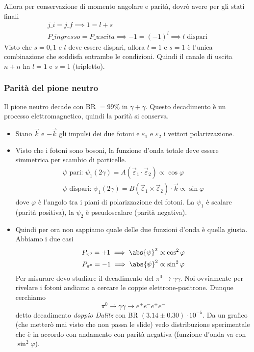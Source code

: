 Allora per conservazione di momento angolare e parità, dovrò avere per gli stati finali 
\begin{gather*}
j\_i=j\_f\implies 1=l+s\\
P\_{ingresso}=P\_{uscita}\implies -1=(-1)^l\implies l \text{ dispari}
\end{gather*}
Visto che $s=0,1$ e $l$ deve essere dispari, allora $l=1$ e $s=1$ è l'unica combinazione che soddisfa entrambe le condizioni. Quindi il canale di uscita $n+n$ ha $l=1$ e $s=1$ (tripletto).
\subsubsection{Parità del pione neutro}
Il pione neutro decade con BR $=99\%$ in $\gamma+\gamma$. Questo decadimento è un processo elettromagnetico, quindi la parità si conserva. 
\begin{itemize}
\item Siano $\vec k$ e $-\vec k$ gli impulsi dei due fotoni e $\varepsilon_1$ e $\varepsilon_2$ i vettori polarizzazione.
\item Visto che i fotoni sono bosoni, la funzione d'onda totale deve essere simmetrica per scambio di particelle.
\begin{gather*}
\psi\text{ pari: } \psi_1(2\gamma)=A(\vec\varepsilon_1\cdot\vec\varepsilon_2)\propto\cos\varphi\\
\psi\text{ dispari: } \psi_1(2\gamma)=B(\vec\varepsilon_1\times\vec\varepsilon_2)\cdot \vec k\propto\sin\varphi
\end{gather*}
dove $\varphi$ è l'angolo tra i piani di polarizzazione dei fotoni. La $\psi_1$ è scalare (parità positiva), la $\psi_2$ è pseudoscalare (parità negativa). 
\item Quindi per ora non sappiamo quale delle due funzioni d'onda è quella giusta. Abbiamo i due casi 
\begin{gather*}
P_{\pi^0}=+1\implies \abs{\psi}^2\propto\cos^2\varphi\\
P_{\pi^0}=-1\implies \abs{\psi}^2\propto\sin^2\varphi
\end{gather*}
Per misurare devo studiare il decadimento del $\pi^0\to\gamma\gamma$. Noi ovviamente per rivelare i fotoni andiamo a cercare le coppie elettrone-positrone. Dunque cerchiamo 
\begin{equation*}
\pi^0\to\gamma\gamma\to e^+e^-e^+e^-
\end{equation*}
detto decadimento \textit{doppio Dalitz} con BR $(3.14\pm0.30)\cdot10^{-5}$. Da un grafico (che metterò mai visto che non passa le slide) vedo distribuzione sperimentale che è in accordo con andamento con parità negativa (funzione d'onda va con $\sin^2\varphi$).
\end{itemize}
